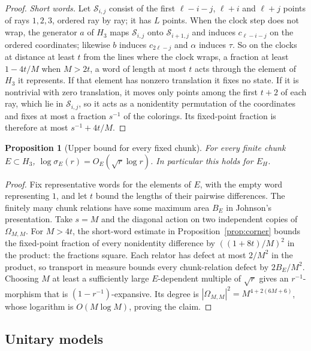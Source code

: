 \documentclass[11pt,a4paper]{article}
\theoremstyle{plain}
\newtheorem{proposition}[theorem]{Proposition}
\theoremstyle{definition}
\theoremstyle{remark}
\begin{document}
\begin{proof}
\emph{Short words.} Let $\mathcal S_{i,j}$ consist of the first $\ell-i-j$, $\ell+i$ and $\ell+j$ points of rays $1,2,3$, ordered ray by
ray; it has $L$ points. When the clock step does not wrap, the generator $a$ of $H_3$ maps $\mathcal S_{i,j}$ onto $\mathcal S_{i+1,j}$ and
induces $c_{\ell-i-j}$ on the ordered coordinates; likewise $b$ induces $c_{2\ell-j}$ and $\alpha$ induces $\tau$. So on the clocks at
distance at least $t$ from the lines where the clock wraps, a fraction at least $1-4t/M$ when $M>2t$, a word of length at most $t$
acts through the element of $H_3$ it represents. If that element has nonzero translation it fixes no state. If it is nontrivial
with zero translation, it moves only points among the first $t+2$ of each ray, which lie in $\mathcal S_{i,j}$, so it acts as a
nonidentity permutation of the coordinates and fixes at most a fraction $s^{-1}$ of the colorings. Its fixed-point fraction is
therefore at most $s^{-1}+4t/M$.
\end{proof}

\begin{proposition}[Upper bound for every fixed chunk]\label{prop:sofic-upper}
For every finite chunk $E\subset H_3$, $\log\sigma_E(r)=O_E(\sqrt r\log r)$. In particular this holds for $E_H$.
\end{proposition}

\begin{proof}
Fix representative words for the elements of $E$, with the empty word representing $1$, and let $t$ bound the lengths of their pairwise
differences. The finitely many chunk relations have some maximum area $B_E$ in Johnson's presentation. Take $s=M$ and the diagonal action
on two independent copies of $\Omega_{M,M}$. For $M>4t$, the short-word estimate in Proposition~\ref{prop:corner} bounds the fixed-point fraction
of every nonidentity difference by $((1+8t)/M)^2$ in the product: the fractions square. Each relator has defect at most $2/M^2$ in the product,
so transport in measure bounds every chunk-relation defect by $2B_E/M^2$.
Choosing $M$ at least a sufficiently large $E$-dependent multiple of $\sqrt r$ gives an $r^{-1}$-morphism that is $(1-r^{-1})$-expansive.
Its degree is $|\Omega_{M,M}|^2=M^{4+2(6M+6)}$, whose logarithm is $O(M\log M)$, proving the claim.
\end{proof}

\subsection{Unitary models}\label{sec:unitary-models}
\end{document}
